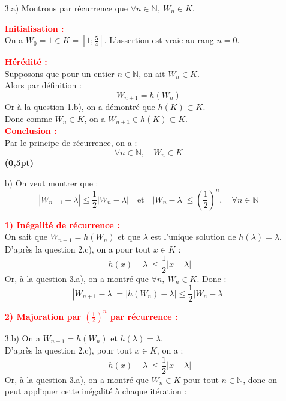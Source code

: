 \documentclass[12pt,a4paper]{article}
\begin{document}
\begin{enumerate}
    \item[3.a)] Montrons par récurrence que \( \forall n \in \mathbb{N},\ W_n \in K \).

        \textcolor{red}{\textbf{Initialisation :}}\\
        On a \( W_0 = 1 \in K = \left[1 ; \frac{5}{4} \right] \). L’assertion est vraie au rang \( n = 0 \).

        \textcolor{red}{\textbf{Hérédité :}}\\
        Supposons que pour un entier \( n \in \mathbb{N} \), on ait \( W_n \in K \).\\
        Alors par définition :
        \[
            W_{n+1} = h(W_n)
        \]
        Or à la question 1.b), on a démontré que \( h(K) \subset K \).\\
        Donc comme \( W_n \in K \), on a \( W_{n+1} \in h(K) \subset K \).\\

        \textcolor{red}{\textbf{Conclusion :}}\\
        Par le principe de récurrence, on a :
        \[
            \forall n \in \mathbb{N},\quad W_n \in K
        \]
        \hfill \textbf{(0,5pt)}

    \item[b)] On veut montrer que :
        \[
            |W_{n+1} - \lambda| \leq \frac{1}{2}|W_n - \lambda| \quad \text{et} \quad |W_n - \lambda| \leq \left( \frac{1}{2} \right)^n, \quad \forall n \in \mathbb{N}
        \]

        \textcolor{red}{\textbf{1) Inégalité de récurrence :}}\\
        On sait que \( W_{n+1} = h(W_n) \) et que \( \lambda \) est l’unique solution de \( h(\lambda) = \lambda \).\\
        D’après la question 2.c), on a pour tout \( x \in K \) :
        \[
            |h(x) - \lambda| \leq \frac{1}{2} |x - \lambda|
        \]
        Or, à la question 3.a), on a montré que \( \forall n, \ W_n \in K \). Donc :
        \[
            |W_{n+1} - \lambda| = |h(W_n) - \lambda| \leq \frac{1}{2} |W_n - \lambda|
        \]

        \textcolor{red}{\textbf{2) Majoration par \( \left( \frac{1}{2} \right)^n \) par récurrence :}}\\

    \item[3.b)] On a \( W_{n+1} = h(W_n) \) et \( h(\lambda) = \lambda \).\\
        D’après la question 2.c), pour tout \( x \in K \), on a :
        \[
            |h(x) - \lambda| \leq \frac{1}{2} |x - \lambda|
        \]
        Or, à la question 3.a), on a montré que \( W_n \in K \) pour tout \( n \in \mathbb{N} \), donc on peut appliquer cette inégalité à chaque itération :


\end{enumerate}
\end{document}
